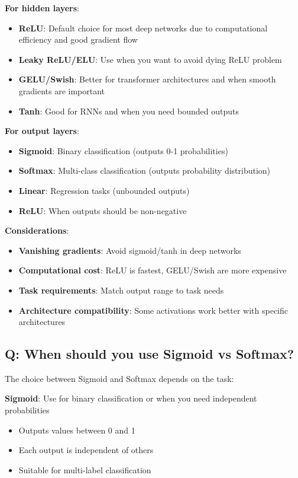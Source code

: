 \textbf{For hidden layers}:
\begin{itemize}
	\item \textbf{ReLU}: Default choice for most deep networks due to computational efficiency and good gradient flow
	\item \textbf{Leaky ReLU/ELU}: Use when you want to avoid dying ReLU problem
	\item \textbf{GELU/Swish}: Better for transformer architectures and when smooth gradients are important
	\item \textbf{Tanh}: Good for RNNs and when you need bounded outputs
\end{itemize}

\textbf{For output layers}:
\begin{itemize}
	\item \textbf{Sigmoid}: Binary classification (outputs 0-1 probabilities)
	\item \textbf{Softmax}: Multi-class classification (outputs probability distribution)
	\item \textbf{Linear}: Regression tasks (unbounded outputs)
	\item \textbf{ReLU}: When outputs should be non-negative
\end{itemize}

\textbf{Considerations}:
\begin{itemize}
	\item \textbf{Vanishing gradients}: Avoid sigmoid/tanh in deep networks
	\item \textbf{Computational cost}: ReLU is fastest, GELU/Swish are more expensive
	\item \textbf{Task requirements}: Match output range to task needs
	\item \textbf{Architecture compatibility}: Some activations work better with specific architectures
\end{itemize}

\subsection*{\textcolor{primaryteal}{Q: When should you use Sigmoid vs Softmax?}}
The choice between Sigmoid and Softmax depends on the task:

\textbf{Sigmoid}: Use for binary classification or when you need independent probabilities
\begin{itemize}
	\item Outputs values between 0 and 1
	\item Each output is independent of others
	\item Suitable for multi-label classification
\end{itemize}

